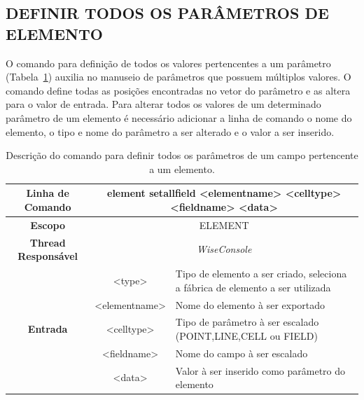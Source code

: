 \subsection{DEFINIR TODOS OS PARÂMETROS DE ELEMENTO}\label{sec:set_all_field_element}

O comando para definição de todos os valores pertencentes a um parâmetro (Tabela~\ref{tab:set_all_field_element}) auxilia no manuseio de parâmetros que possuem múltiplos valores. O comando define todas as posições encontradas no vetor do parâmetro e as altera para o valor de entrada. Para alterar todos os valores de um determinado parâmetro de um elemento é necessário adicionar a linha de comando o nome do elemento, o tipo e nome do parâmetro a ser alterado e o valor a ser inserido.

\begin{center}
	\begin{table}[!htbp]
		\begin{tabularx}{\textwidth}{c|c|X}
			\toprule
			\textbf{Linha de Comando} & \multicolumn{2}{X}{element set\underline{\space\space}all\underline{\space\space}field <element\underline{\space\space}name> <cell\underline{\space\space}type> <field\underline{\space\space}name> <data>} \\
			\midrule
			\textbf{Escopo} & \multicolumn{2}{c}{ELEMENT} \\
			\hline
			\textbf{Thread Responsável} & \multicolumn{2}{c}{\textit{WiseConsole}} \\
			\hline
			\multirow{5}{*}{\textbf{Entrada}} & <type> & Tipo de elemento a ser criado, seleciona a fábrica de elemento a ser utilizada \\
			
			& <element\underline{\space\space}name> & Nome do elemento à ser exportado \\
			& <cell\underline{\space\space}type> & Tipo de parâmetro à ser escalado (POINT,LINE,CELL ou FIELD) \\
			& <field\underline{\space\space}name> & Nome do campo à ser escalado \\
			& <data> & Valor à ser inserido como parâmetro do elemento  \\
			\bottomrule
		\end{tabularx}
		\caption{Descrição do comando para definir todos os parâmetros de um campo pertencente a um elemento.}
		\label{tab:set_all_field_element}
	\end{table}
\end{center}


